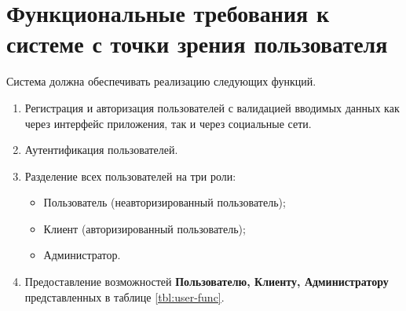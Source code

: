 \section*{Функциональные требования к системе с точки зрения пользователя}
Система должна обеспечивать реализацию следующих функций.
\begin{enumerate}
	\item Регистрация и авторизация пользователей с валидацией вводимых данных как через интерфейс приложения, так и через	социальные сети.
	
	\item Аутентификация пользователей.
	
	\item Разделение всех пользователей на три роли:
	\begin{itemize}
		\item Пользователь (неавторизированный пользователь);
		
		\item Клиент (авторизированный пользователь);
		
		\item Администратор.
	\end{itemize}
	
	\item Предоставление возможностей \textbf{Пользователю, Клиенту, Администратору} представленных в таблице \ref{tbl:user-func}.
\end{enumerate}

